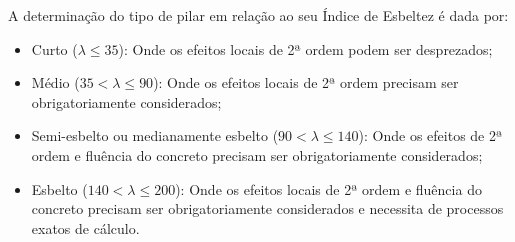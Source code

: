 A determinação do tipo de pilar em relação ao seu Índice de Esbeltez é dada por:

\begin{itemize}
	\item Curto ($\lambda\leqslant35$): Onde os efeitos locais de 2ª ordem podem ser desprezados;
	\item Médio ($35<\lambda\leqslant90$): Onde os efeitos locais de 2ª ordem precisam ser obrigatoriamente considerados;
	\item Semi-esbelto ou medianamente esbelto ($90<\lambda\leqslant140$): Onde os efeitos de 2ª ordem e fluência do concreto precisam ser obrigatoriamente considerados;
	\item Esbelto ($140<\lambda\leqslant200$): Onde os efeitos locais de 2ª ordem e fluência do concreto precisam ser obrigatoriamente considerados e necessita de processos exatos de cálculo.
\end{itemize}